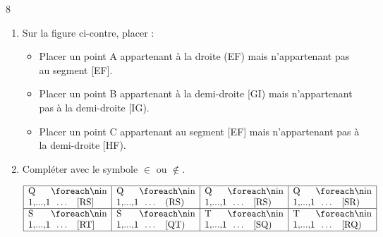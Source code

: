 \documentclass[a4paper]{book}
\begin{document}
{\begin{exerciceNote}{8}
\begin{enumerate}
            \bigskip
            
            \item 
            \begin{minipage}{0.5\linewidth}
                Sur la figure ci-contre, placer :

                \begin{itemize}
                    \item Placer un point A appartenant à la droite (EF) mais n'appartenant pas au segment [EF].
                    \item Placer un point B appartenant à la demi-droite [GI) mais n'appartenant pas à la demi-droite [IG).
                    \item Placer un point C appartenant au segment [EF] mais n'appartenant pas à la demi-droite [HF).
                \end{itemize}
            \end{minipage}
            \hfill
            \begin{minipage}{0.49\linewidth}
                \begin{center}
                \end{center}
            \end{minipage}


\newpage
            
                
            \item Compléter avec le symbole $\in$ ou $\notin$.
    
            \begin{center}
            \end{center}
    
            \begin{center}
                $\begin{array}{|p{3cm}|p{3cm}|p{3cm}|p{3cm}|}
                    \hline
                     Q \points[1] [RS] & Q \points[1] (RS) & Q \points[1] [RS) & Q \points[1] [SR)  \\[2ex] \hline
                     S \points[1] [RT] & S \points[1] [QT) & T \points[1] [SQ) & T \points[1] [RQ)  \\[2ex] \hline
                \end{array}$
            \end{center}
        \end{enumerate}
    \end{exerciceNote}


}
\end{document}
